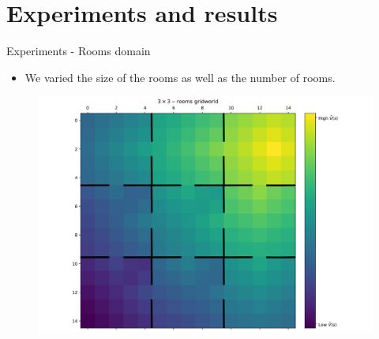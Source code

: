 \documentclass{beamer}
\theoremstyle{mystyle}
\begin{document}
\section{Experiments and results}
\begin{frame}{Experiments - Rooms domain}


\begin{itemize}
    \item We varied the size of the rooms as well as the number of rooms.
\end{itemize}

\begin{figure}[H]
\centering
\includegraphics[scale=0.25]{Figures/grid_domain_VF.png}

\label{fig:vf_grid}
\end{figure}
    
\end{frame}
\end{document}
